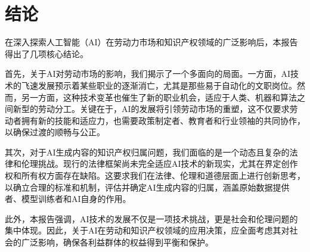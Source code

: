 \documentclass[11pt]{article}
\begin{document}
\section{结论}

在深入探索人工智能（AI）在劳动力市场和知识产权领域的广泛影响后，本报告得出了几项核心结论。

首先，关于AI对劳动市场的影响，我们揭示了一个多面向的局面。一方面，AI技术的飞速发展预示着某些职业的逐渐消亡，尤其是那些易于自动化的文职岗位。然而，另一方面，这种技术变革也催生了新的职业机会，适应于人类、机器和算法之间新型的劳动分工。关键在于，AI的发展将引领劳动市场的重塑，这不仅要求劳动者拥有新的技能和适应力，也需要政策制定者、教育者和行业领袖的共同协作，以确保过渡的顺畅与公正。

其次，对于AI生成内容的知识产权归属问题，我们面临的是一个动态且复杂的法律和伦理挑战。现行的法律框架尚未完全适应AI技术的新现实，尤其在界定创作权和所有权方面存在缺陷。这要求我们在法律、伦理和道德层面上进行创新思考，以确立合理的标准和机制，评估并确定AI生成内容的归属，涵盖原始数据提供者、模型训练者和AI自身的作用。

此外，本报告强调，AI技术的发展不仅是一项技术挑战，更是社会和伦理问题的集中体现。因此，关于AI在劳动和知识产权领域的应用决策，应全面考虑其对社会的广泛影响，确保各利益群体的权益得到平衡和保护。
\end{document}
